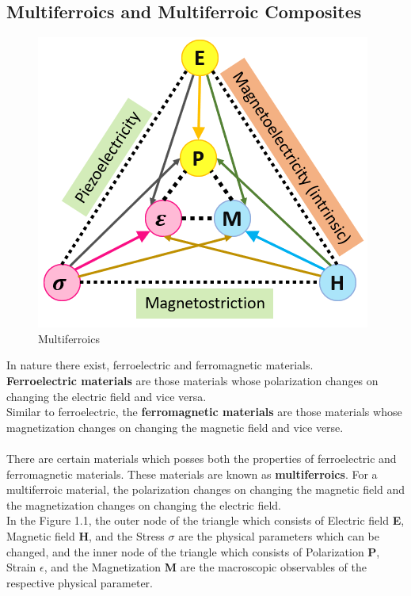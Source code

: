 \documentclass[12pt,a4paper,bold]{thesis}
\theoremstyle{thm}
\theoremstyle{definition}
\begin{document}
\subsection{Multiferroics and Multiferroic Composites}
\begin{figure}[H]
	\centering
   \includegraphics[scale=0.56]{Images/18.png} 
   \caption{Multiferroics}
\end{figure}
In nature there exist, ferroelectric and ferromagnetic materials. \\
\textbf{Ferroelectric materials} are those materials whose polarization changes on changing the electric field and vice versa.\\
Similar to ferroelectric, the \textbf{ferromagnetic materials} are those materials whose magnetization changes on changing the magnetic field and vice verse.~\cite{RefWorks:165} \\\\
There are certain materials which posses both the properties of ferroelectric and ferromagnetic materials. These materials are known as \textbf{multiferroics}. For a multiferroic material, the polarization changes on changing the magnetic field and the magnetization changes on changing the electric field.\\   
In the Figure 1.1, the outer node of the triangle which consists of Electric field \textbf{E}, Magnetic field \textbf{H}, and the Stress \textbf{$\sigma$} are the physical parameters which can be changed, and the inner node of the triangle which consists of Polarization \textbf{P}, Strain \textbf{$\epsilon$}, and the Magnetization \textbf{M} are the  macroscopic observables of the respective physical parameter.\cite{roy14_6}~\cite{RefWorks:164}\\
\end{document}
